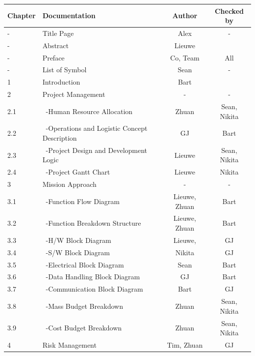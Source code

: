 \newpage
\begin{center}
\begin{longtable}{|l|l|c|c|}\hline
 Chapter & Documentation                      & Author & Checked by \\\hline\hline
 -       & Title Page                           & Alex & - \\\hline     -       & Abstract                             & Lieuwe & \\\hline    
 -       & Preface                              & Co, Team& All \\\hline
 -       & List of Symbol                       & Sean & - \\\hline\hline
 1       & Introduction                         & Bart &\\\hline\hline
 2       & Project Management                   & - & -\\\hline
 2.1     & \ -Human Resource Allocation         & Zhuan & Sean, Nikita \\\hline
 2.2     & \ -Operations and Logistic Concept Description & GJ & Bart \\\hline
 2.3     & \ -Project Design and Development Logic & Lieuwe & Sean, Nikita \\\hline
 2.4     & \ -Project Gantt Chart               & Lieuwe & Nikita \\\hline\hline
 3       & Mission Approach                     & - & -\\\hline
 3.1     & \ -Function Flow Diagram             & Lieuwe, Zhuan & Bart \\\hline
 3.2     & \ -Function Breakdown Structure      & Lieuwe, Zhuan & Bart \\\hline
 3.3     & \ -H/W Block Diagram                 & Lieuwe, & GJ \\\hline
 3.4     & \ -S/W Block Diagram                 & Nikita & GJ \\\hline
 3.5     & \ -Electrical Block Diagram          & Sean & Bart \\\hline
 3.6     & \ -Data Handling Block Diagram       & GJ & Bart\\\hline
 3.7     & \ -Communication Block Diagram       & Bart & GJ\\\hline
 3.8     & \ -Mass Budget Breakdown             & Zhuan & Sean, Nikita \\\hline
 3.9     & \ -Cost Budget Breakdown             & Zhuan & Sean, Nikita \\\hline\hline
 4       & Risk Management                      & Tim, Zhuan & GJ \\\hline\hline

\end{longtable}
\end{center}
